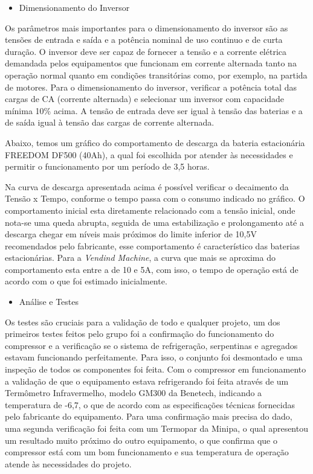 \begin{itemize}
\item Dimensionamento do Inversor
\end{itemize}

        Os parâmetros mais importantes para o dimensionamento do inversor são as tensões de entrada e saída e a potência nominal de uso continuo e de curta duração. O inversor deve ser capaz de fornecer a tensão e a corrente elétrica demandada pelos equipamentos que funcionam em corrente alternada tanto na operação normal quanto em condições transitórias como, por exemplo, na partida de motores.
Para o dimensionamento do inversor, verificar a potência total das cargas de CA (corrente alternada) e selecionar um inversor com capacidade mínima 10\% acima. A tensão de entrada deve ser igual à tensão das baterias e a de saída igual à tensão das cargas de corrente alternada.

        Abaixo, temos um gráfico do comportamento de descarga da bateria estacionária FREEDOM DF500 (40Ah), a qual foi escolhida por atender às necessidades e permitir o funcionamento por um período de 3,5 horas.


		Na curva de descarga apresentada acima é possível verificar o decaimento da Tensão x Tempo, conforme o tempo passa com o consumo indicado no gráfico. O comportamento inicial esta diretamente relacionado com a tensão inicial, onde nota-se uma queda abrupta, seguida de uma estabilização e prolongamento até a descarga chegar em níveis mais próximos do limite inferior de 10,5V recomendados pelo fabricante, esse comportamento é característico das baterias estacionárias.
        Para a \textit{Vendind Machine}, a curva que mais se aproxima do comportamento esta entre a de 10 e 5A, com isso, o tempo de operação está de acordo com o que foi estimado inicialmente.

\begin{itemize}
\item Análise e Testes
\end{itemize}
			 Os testes são cruciais para a validação de todo e qualquer projeto, um dos primeiros testes feitos pelo grupo foi a confirmação do funcionamento do compressor e a verificação se o sistema de refrigeração, serpentinas e agregados estavam funcionando perfeitamente. Para isso, o conjunto foi desmontado e uma inspeção de todos os componentes foi feita. Com o compressor em funcionamento a validação de que o equipamento estava refrigerando foi feita através de um Termômetro Infravermelho, modelo GM300 da Benetech, indicando a temperatura de -6,7\degree, o que de acordo com as especificações técnicas fornecidas pelo fabricante do equipamento. Para uma confirmação mais precisa do dado, uma segunda verificação foi feita com um Termopar da Minipa, o qual apresentou um resultado muito próximo do outro equipamento, o que confirma que o compressor está com um bom funcionamento e sua temperatura de operação atende às necessidades do projeto.

